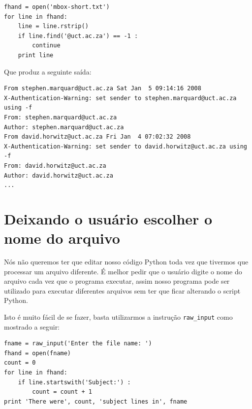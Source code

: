 \beforeverb
\begin{verbatim}
fhand = open('mbox-short.txt')
for line in fhand:
    line = line.rstrip()
    if line.find('@uct.ac.za') == -1 : 
        continue
    print line
\end{verbatim}
\afterverb

Que produz a seguinte saída:

\beforeverb
\begin{verbatim}
From stephen.marquard@uct.ac.za Sat Jan  5 09:14:16 2008
X-Authentication-Warning: set sender to stephen.marquard@uct.ac.za using -f
From: stephen.marquard@uct.ac.za
Author: stephen.marquard@uct.ac.za
From david.horwitz@uct.ac.za Fri Jan  4 07:02:32 2008
X-Authentication-Warning: set sender to david.horwitz@uct.ac.za using -f
From: david.horwitz@uct.ac.za
Author: david.horwitz@uct.ac.za
...
\end{verbatim}
\afterverb

\section{Deixando o usuário escolher o nome do arquivo}

Nós não queremos ter que editar nosso código Python toda vez
que tivermos que processar um arquivo diferente. É melhor
pedir que o usuário digite o nome do arquivo cada vez que
o programa executar, assim nosso programa pode ser utilizado
para executar diferentes arquivos sem ter que ficar alterando
o script Python.

Isto é muito fácil de se fazer, basta utilizarmos a instrução
\verb"raw_input" como mostrado a seguir:

\beforeverb
\begin{verbatim}
fname = raw_input('Enter the file name: ')
fhand = open(fname)
count = 0
for line in fhand:
    if line.startswith('Subject:') :
        count = count + 1
print 'There were', count, 'subject lines in', fname
\end{verbatim}
\afterverb

